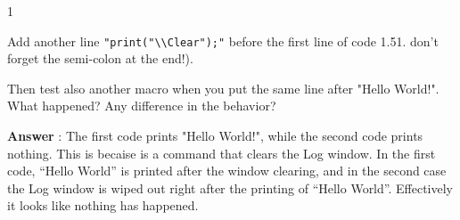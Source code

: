 \begin{indentexercise}
{1}
\item Add another line \texttt{"print("\textbackslash{}\textbackslash{}Clear");"} 
before the first line of code 1.51. don't forget the semi-colon at the end!). 
\item
Then test also another macro when you put the same line after "Hello World!". 
What happened? Any difference in the behavior? 
\item

\item \textbf{Answer} : The first code prints "Hello World!", while the second code prints nothing. This is becaise  is a command that clears the Log window. In the first code, ``Hello World'' is printed after the window clearing, and in the second case the Log window is wiped out right after the printing of ``Hello World''. Effectively it looks like nothing has happened.  

\end{indentexercise}